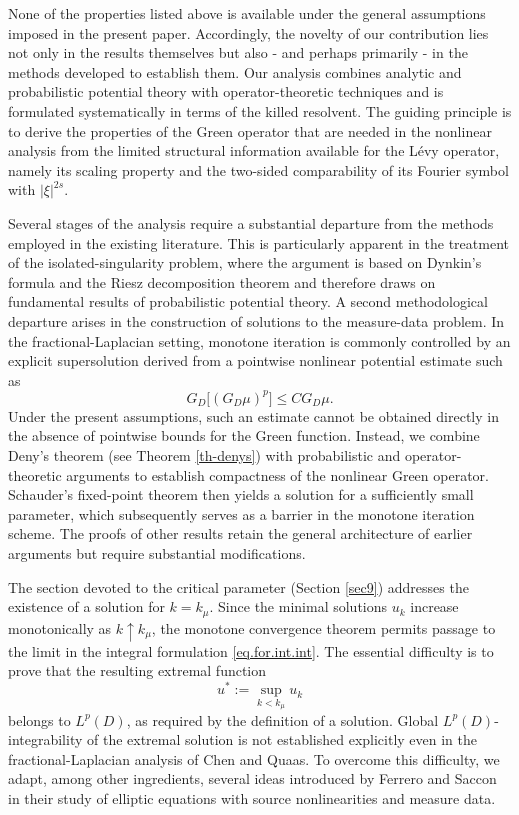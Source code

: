 \documentclass[11pt,a4paper,reqno]{amsart}
\theoremstyle{definition}
\numberwithin{equation}{section}
\begin{document}
None of the properties listed above is available  under the general assumptions imposed 
in the present paper. Accordingly, the novelty of our contribution lies not only in the results themselves 
but also - and perhaps primarily - in the methods developed to establish them. Our analysis combines analytic and 
probabilistic potential theory with operator-theoretic techniques and is formulated systematically in terms of the killed resolvent. 
The guiding principle is to derive the properties of
the Green operator that are needed in the nonlinear analysis from the limited structural information available for the L\'evy operator, 
namely its scaling property and the two-sided comparability of its Fourier symbol with
$|\xi|^{2s}$.



Several stages of the analysis require a substantial departure from the methods employed in the existing literature. 
This is particularly apparent in the treatment of the isolated-singularity problem, where the argument is based on Dynkin's 
formula and the Riesz decomposition theorem and therefore draws on fundamental results of probabilistic potential theory.
A second methodological departure arises in the construction of solutions to the measure-data problem. 
In the fractional-Laplacian setting, monotone iteration is commonly controlled by an explicit supersolution derived from a 
pointwise nonlinear potential estimate such as 
\[ 
G_D\bigl[(G_D\mu)^p\bigr]\leq C G_D\mu. 
\] 
Under the present assumptions, such an estimate cannot be obtained directly in the absence of pointwise 
bounds for the Green function. Instead, we combine Deny's theorem (see Theorem \ref{th-denys}) with probabilistic and operator-theoretic arguments 
to establish compactness of the nonlinear Green operator. Schauder's fixed-point theorem then yields a solution 
for a sufficiently small parameter, which subsequently serves as a barrier in the monotone iteration scheme.
The proofs of other results retain the general architecture of earlier
arguments but require substantial modifications. 

The section devoted to the critical parameter (Section \ref{sec9}) addresses the existence of a solution for \(k=k_\mu\). 
Since the minimal solutions \(u_k\) increase monotonically as \(k\uparrow k_\mu\), the monotone convergence theorem permits 
passage to the limit in the integral formulation \eqref{eq.for.int.int}. The essential difficulty is to prove that the resulting extremal function 
\[
u^*:=\sup_{k<k_\mu}u_k 
\]
belongs to \(L^p(D)\), as required by the definition of a solution. 
Global \(L^p(D)\)-integrability of the extremal solution is not established explicitly even 
in the fractional-Laplacian analysis of Chen and Quaas. 
To overcome this difficulty, we adapt, among other ingredients, several ideas introduced by Ferrero and Saccon \cite{lit:FerreroSaccon2006} 
in their study of elliptic equations with source nonlinearities and measure data.
\end{document}
